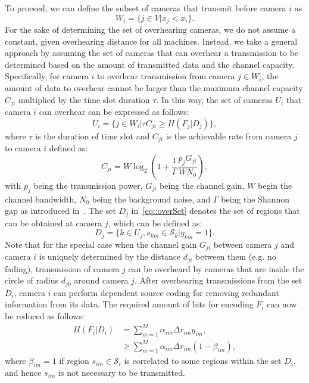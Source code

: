 To proceed, we can define the subset of cameras that transmit before camera $i$ as
\begin{equation}
W_i = \{ j \in V | x_j < x_i \}.
\label{eq::prevSet}
\end{equation}
For the sake of determining the set of overhearing cameras, we do not assume a constant, given overhearing distance for all machines.
Instead, we take a general approach by assuming the set of cameras that can overhear a transmission to be determined based on the amount of transmitted data and the channel capacity.
Specifically, for camera $i$ to overhear transmission from camera $j \in W_i$, the amount of data to overhear cannot be larger than the maximum channel capacity $C_{ji}$ multiplied by the time slot duration $\tau$.
In this way, the set of cameras $U_i$ that camera $i$ can overhear can be expressed as follows:
\begin{equation}
U_i = \{ j \in W_i | \tau C_{ji} \geq H(F_j|D_j) \},
\label{eq::overSet}
\end{equation}
where $\tau$ is the duration of time slot and $C_{ji}$ is the achievable rate from camera $j$ to camera $i$ defined as:
\begin{equation}
C_{ji} = W \log_2 \left( 1+\frac{1}{\Gamma} \frac{p_j G_{ji}}{WN_0} \right),
\label{eq::capacity}
\end{equation}
with $p_j$ being the transmission power, $G_{ji}$ being the channel gain, $W$ begin the channel bandwidth, $N_0$ being the background noise, and $\Gamma$ being the Shannon gap as introduced in~\cite{MQAM}.
The set $D_j$ in~\eqref{eq::overSet} denotes the set of regions that can be obtained at camera $j$, which can be defined as:
\begin{equation}
D_j = \{ k \in U_j, s_{km} \in \mathcal{S}_k | y_{km} = 1 \}.
\label{eq::overRegionSet}
\end{equation}
Note that for the special case when the channel gain $G_{ji}$ between camera $j$ and camera $i$ is uniquely determined by the distance $d_{ji}$ between them (e.g. no fading), transmission of camera $j$ can be overheard by cameras that are inside the circle of radius $d_{j0}$ around camera $j$.
After overhearing transmissions from the set $D_i$, camera $i$ can perform dependent source coding for removing redundant information from its data.
The required amount of bits for encoding $F_i$ can now be reduced as follows:
\begin{align}
H(F_i|D_i) &= \sum_{m=1}^{M} \alpha_{im} \Delta r_{im} y_{im}, \nonumber \\
           &\geq \sum_{m=1}^{M} \alpha_{im} \Delta r_{im} (1-\beta_{im}),
\label{eq::conditionalEntropy}
\end{align}
where $\beta_{im} = 1$ if region $s_{im} \in \mathcal{S}_i$ is correlated to some regions within the set $D_i$, and hence $s_{im}$ is not necessary to be transmitted.

